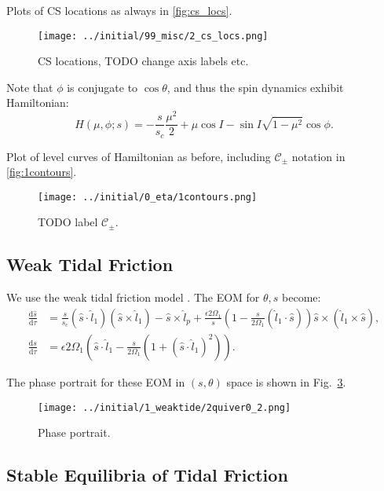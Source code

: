 \documentclass[
        fleqn,
        usenatbib,
        referee,
    ]{mnras}
\newcommand*{\rd}[2]{\frac{\mathrm{d}#1}{\mathrm{d}#2}}
\newcommand*{\p}[1]{\left(#1\right)}
\begin{document}
Plots of CS locations as always in \autoref{fig:cs_locs}.
\begin{figure}
    \centering
    \texttt{[image: ../initial/99\_misc/2\_cs\_locs.png]}
    \caption{CS locations, TODO change axis labels etc.}\label{fig:cs_locs}
\end{figure}

Note that $\phi$ is conjugate to $\cos \theta$, and thus the spin dynamics
exhibit Hamiltonian:
\begin{equation}
    H(\mu, \phi; s) = -\frac{s}{s_c}\frac{\mu^2}{2}
        + \mu \cos I - \sin I \sqrt{1 - \mu^2}\cos \phi.
\end{equation}

Plot of level curves of Hamiltonian as before, including $\mathcal{C}_{\pm}$
notation in \autoref{fig:1contours}.
\begin{figure}
    \centering
    \texttt{[image: ../initial/0\_eta/1contours.png]}
    \caption{TODO label $\mathcal{C}_{\pm}$.}\label{fig:1contours}
\end{figure}

\subsection{Weak Tidal Friction}\label{ss:weak_tides}

We use the weak tidal friction model \citep{lai2012}. The EOM for $\theta, s$
become:
\begin{align}
    \rd{\hat{s}}{\tau}
        &= \frac{s}{s_c}\p{\hat{s} \cdot \hat{l}_1}\p{\hat{s} \times
                \hat{l}_1} - \hat{s} \times \hat{l}_p
            + \frac{\epsilon 2\Omega_1}{s}
                \p{1 - \frac{s}{2\Omega_1}\p{\hat{l}_1 \cdot \hat{s}}}
                    \hat{s} \times \p{\hat{l}_1 \times \hat{s}},\\
    \rd{s}{\tau}
        &= \epsilon 2\Omega_1 \p{\hat{s} \cdot \hat{l}_1 -
            \frac{s}{2\Omega_1}\p{1 + \p{\hat{s} \cdot \hat{l}_1}^2}}.
\end{align}

The phase portrait for these EOM in $\p{s, \theta}$ space is shown in
Fig.~\ref{fig:quiver}.
\begin{figure}
    \centering
    \texttt{[image: ../initial/1\_weaktide/2quiver0\_2.png]}
    \caption{Phase portrait.}\label{fig:quiver}
\end{figure}

\subsection{Stable Equilibria of Tidal Friction}\label{ss:tidal_eqs}
\end{document}
